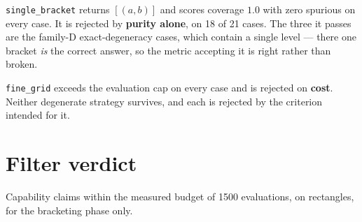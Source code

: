 \texttt{single\_bracket} returns $[(a,b)]$ and scores coverage $1.0$ with zero spurious on every
case. It is rejected by \textbf{purity alone}, on 18 of 21 cases. The three it passes are the
family-D exact-degeneracy cases, which contain a single level --- there one bracket \emph{is}
the correct answer, so the metric accepting it is right rather than broken.

\texttt{fine\_grid} exceeds the evaluation cap on every case and is rejected on \textbf{cost}.
Neither degenerate strategy survives, and each is rejected by the criterion intended for it.

\section{Filter verdict}

Capability claims within the measured budget of 1500 evaluations, on rectangles, for the
bracketing phase only.

